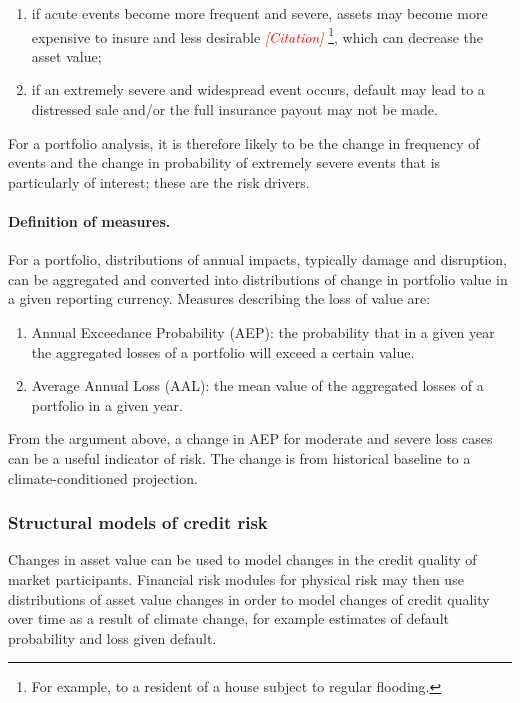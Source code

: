 \documentclass[a4paper,11pt]{extarticle} %
\begin{document}
\begin{enumerate}
	\item if acute events become more frequent and severe, assets may become more expensive to insure and less desirable {\textcolor{red}{\emph{[Citation]}}} \footnote{For example, to a resident of a house subject to regular flooding.}, which can decrease the asset value;
	\item if an extremely severe and widespread event occurs, default may lead to a distressed sale and/or the full insurance payout may not be made. 
\end{enumerate}

For a portfolio analysis, it is therefore likely to be the change in frequency of events and the change in probability of extremely severe events that is particularly of interest; these are the risk drivers.

\paragraph{Definition of measures.} For a portfolio, distributions of annual impacts, typically damage and disruption, can be aggregated and converted into distributions of change in portfolio value in a given reporting currency. Measures describing the loss of value are:

\begin{enumerate}
    \item Annual Exceedance Probability (AEP): the probability that in a given year the aggregated losses of a portfolio will exceed a certain value.
    \item Average Annual Loss (AAL): the mean value of the aggregated losses of a portfolio in a given year.
\end{enumerate}

From the argument above, a change in AEP for moderate and severe loss cases can be a useful indicator of risk. The change is from historical baseline to a climate-conditioned projection.

\subsubsection{Structural models of credit risk}
Changes in asset value can be used to model changes in the credit quality of market participants. Financial risk modules for physical risk may then use distributions of asset value changes in order to model changes of credit quality over time as a result of climate change, for example estimates of default probability and loss given default.
\end{document}
